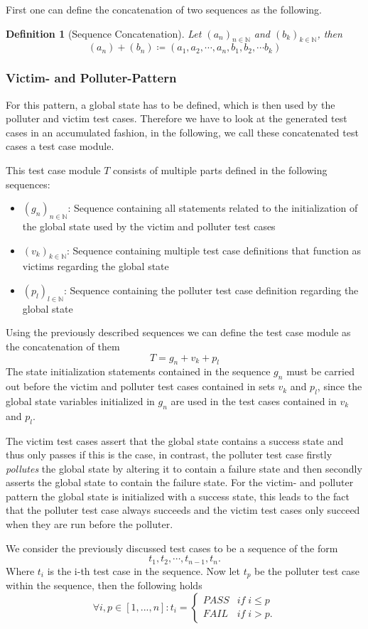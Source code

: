\documentclass[
fancyheadings, %
%
%
]{stsreprt}
\newtheorem{definition}{Definition}
\begin{document}
First one can define the concatenation of two sequences as the following.
\begin{definition}[Sequence Concatenation]
    Let $(a_n)_{n \in \mathbb{N}}$ and $(b_k)_{k \in \mathbb{N}}$, then
    \[
       (a_n) + (b_n) \coloneqq (a_1, a_2, \cdots , a_n, b_1, b_2, \cdots b_k)
    \]
\end{definition}
\subsubsection{Victim- and Polluter-Pattern}
For this pattern, a global state has to be defined, which is then used by the polluter and victim test cases. 
Therefore we have to look at the generated test cases in an accumulated fashion, in the following, we call these concatenated test cases a test case module. \par
This test case module $T$ consists of multiple parts defined in the following sequences:
\begin{itemize}
    \item $(g_n)_{n \in \mathbb{N}}$: Sequence containing all statements related to the initialization of the global state used by the victim and polluter test cases
    \item $(v_k)_{k \in \mathbb{N}}$: Sequence containing multiple test case definitions that function as victims regarding the global state
    \item $(p_l)_{l \in \mathbb{N}}$: Sequence containing the polluter test case definition regarding the global state
\end{itemize}
Using the previously described sequences we can define the test case module as the concatenation of them
\[
    T = g_n + v_k + p_l 
\]
The state initialization statements contained in the sequence $g_n$ must be carried out before the victim and polluter test cases contained in sets $v_k$ and $p_l$, since the global state variables initialized in $g_n$ are used in the test cases contained in $v_k$ and $p_l$. \par
The victim test cases assert that the global state contains a success state and thus only passes if this is the case, in contrast, the polluter test case firstly \textit{pollutes} the global state by altering it to contain a failure state and then secondly asserts the global state to contain the failure state. 
For the victim- and polluter pattern the global state is initialized with a success state, this leads to the fact that the polluter test case always succeeds and the victim test cases only succeed when they are run before the polluter. \par
We consider the previously discussed test cases to be a sequence of the form
\[
    t_1, t_2, \cdots, t_{n-1}, t_n.
\]
Where $t_i$ is the i-th test case in the sequence. Now let $t_p$ be the polluter test case within the sequence, then the following holds
\begin{equation*}
\forall i,p \in [1, ..., n]:
t_i=
    \begin{cases}
        PASS  & if \; i \leq p  \\
        FAIL  & if \; i > p .
    \end{cases}
\end{equation*}
\end{document}
